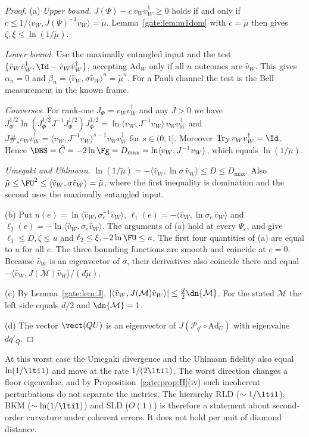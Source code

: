 \begin{proof}
(a) \emph{Upper bound.} $J(\Psi)-c\,v_Wv_W^\dagger\ge0$ holds if and only if $c\le1/\langle v_W,J(\Psi)^{-1}v_W\rangle=\tilde\mu$. Lemma~\ref{gate:lem:m1dom} with $c=\tilde\mu$ then gives $\zeta,\xi\le\ln(1/\tilde\mu)$.

\emph{Lower bound.} Use the maximally entangled input and the test $\{\hat v_W\hat v_W^\dagger,\Id-\hat v_W\hat v_W^\dagger\}$, accepting $\mathrm{Ad}_W$ only if all $n$ outcomes are $\hat v_W$. This gives $\alpha_n=0$ and $\beta_n=\langle\hat v_W,\sigma\hat v_W\rangle^n=\tilde\mu^n$. For a Pauli channel the test is the Bell measurement in the known frame.

\emph{Converses.} For rank-one $J_\Phi=v_Wv_W^\dagger$ and any $J>0$ we have $J_\Phi^{1/2}\ln(J_\Phi^{1/2}J^{-1}J_\Phi^{1/2})J_\Phi^{1/2}=\ln\langle v_W,J^{-1}v_W\rangle\,v_Wv_W^\dagger$ and $J\#_sv_Wv_W^\dagger=\langle v_W,J^{-1}v_W\rangle^{s-1}v_Wv_W^\dagger$ for $s\in(0,1]$. Moreover $\Tr_{\mathcal Y}v_Wv_W^\dagger=\Id$. Hence $\DBS=\hat C=-2\ln\Fg=D_{\max}=\ln\langle v_W,J^{-1}v_W\rangle$, which equals $\ln(1/\tilde\mu)$.

\emph{Umegaki and Uhlmann.} $\ln(1/\tilde\mu)=-\langle\hat v_W,\ln\sigma\,\hat v_W\rangle\le D\le D_{\max}$. Also $\tilde\mu\le\FU^2\le\langle\hat v_W,\sigma\hat v_W\rangle=\tilde\mu$, where the first inequality is domination and the second uses the maximally entangled input.

(b) Put $u(e)=\ln\langle\hat v_W,\sigma_e^{-1}\hat v_W\rangle$, $\ell_1(e)=-\langle\hat v_W,\ln\sigma_e\,\hat v_W\rangle$ and $\ell_2(e)=-\ln\langle\hat v_W,\sigma_e\hat v_W\rangle$. The arguments of (a) hold at every $\Psi_e$, and give $\ell_1\le D,\zeta\le u$ and $\ell_2\le\xi,-2\ln\FU\le u$. The first four quantities of (a) are equal to $u$ for all $e$. The three bounding functions are smooth and coincide at $e=0$. Because $\hat v_W$ is an eigenvector of $\sigma$, their derivatives also coincide there and equal $-\langle\hat v_W,J(\mathcal M)\hat v_W\rangle/(d\tilde\mu)$.

(c) By Lemma~\ref{gate:lem:J}, $|\langle\hat v_W,J(\mathcal M)\hat v_W\rangle|\le\frac d2\dn{\mathcal M}$. For the stated $\mathcal M$ the left side equals $d/2$ and $\dn{\mathcal M}=1$.

(d) The vector $\vect(QU)$ is an eigenvector of $J(\mathcal P_{q'}\circ\mathrm{Ad}_U)$ with eigenvalue $dq'_Q$.
\end{proof}

\begin{remark}\label{gate:rem:m1hier}
At this worst case the Umegaki divergence and the Uhlmann fidelity also equal $\ln(1/\ltil)$ and move at the rate $1/(2\ltil)$. The worst direction changes a floor eigenvalue, and by Proposition~\ref{gate:prop:H}(iv) such incoherent perturbations do not separate the metrics. The hierarchy RLD ($\sim1/\ltil$), BKM ($\sim\ln(1/\ltil)$) and SLD ($O(1)$) is therefore a statement about second-order curvature under coherent errors. It does not hold per unit of diamond distance.
\end{remark}

